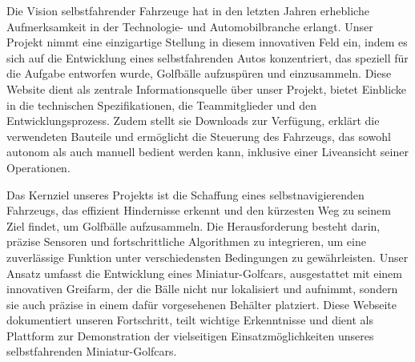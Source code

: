 Die Vision selbstfahrender Fahrzeuge hat in den letzten Jahren erhebliche Aufmerksamkeit in der Technologie- und Automobilbranche erlangt. Unser Projekt nimmt eine einzigartige Stellung in diesem innovativen Feld ein, indem es sich auf die Entwicklung eines selbstfahrenden Autos konzentriert, das speziell für die Aufgabe entworfen wurde, Golfbälle aufzuspüren und einzusammeln. Diese Website dient als zentrale Informationsquelle über unser Projekt, bietet Einblicke in die technischen Spezifikationen, die Teammitglieder und den Entwicklungsprozess. Zudem stellt sie Downloads zur Verfügung, erklärt die verwendeten Bauteile und ermöglicht die Steuerung des Fahrzeugs, das sowohl autonom als auch manuell bedient werden kann, inklusive einer Liveansicht seiner Operationen.

Das Kernziel unseres Projekts ist die Schaffung eines selbstnavigierenden Fahrzeugs, das effizient Hindernisse erkennt und den kürzesten Weg zu seinem Ziel findet, um Golfbälle aufzusammeln. Die Herausforderung besteht darin, präzise Sensoren und fortschrittliche Algorithmen zu integrieren, um eine zuverlässige Funktion unter verschiedensten Bedingungen zu gewährleisten. Unser Ansatz umfasst die Entwicklung eines Miniatur-Golfcars, ausgestattet mit einem innovativen Greifarm, der die Bälle nicht nur lokalisiert und aufnimmt, sondern sie auch präzise in einem dafür vorgesehenen Behälter platziert. Diese Webseite dokumentiert unseren Fortschritt, teilt wichtige Erkenntnisse und dient als Plattform zur Demonstration der vielseitigen Einsatzmöglichkeiten unseres selbstfahrenden Miniatur-Golfcars.
